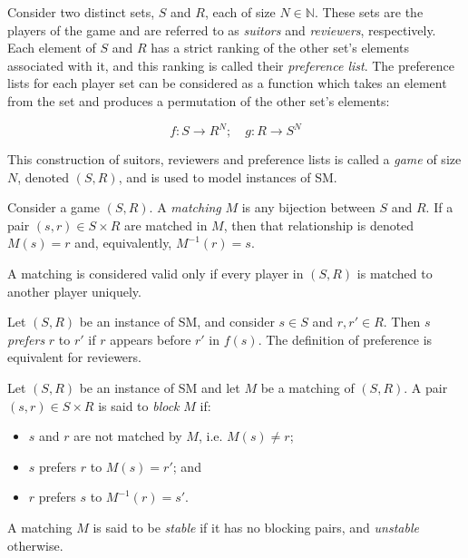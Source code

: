 \begin{definition}\label{def:sm_game}
    Consider two distinct sets, \(S\) and \(R\), each of size \(N \in \mathbb
    N\). These sets are the players of the game and are referred to as
    \emph{suitors} and \emph{reviewers}, respectively. Each element of \(S\) and
    \(R\) has a strict ranking of the other set's elements associated with it,
    and this ranking is called their \emph{preference list}. The preference
    lists for each player set can be considered as a function which takes an
    element from the set and produces a permutation of the other set's elements:

    \begin{equation}
        f: S \to R^N; \quad g: R \to S^N
    \end{equation}

    This construction of suitors, reviewers and preference lists is called a
    \emph{game} of size \(N\), denoted \((S, R)\), and is used to
    model instances of SM.
\end{definition}

\begin{definition}\label{def:sm_matching}
    Consider a game \((S, R)\). A \emph{matching} \(M\) is any
    bijection between \(S\) and \(R\). If a pair \((s, r) \in S
    \times R\) are matched in \(M\), then that relationship is denoted \(M(s) =
    r\) and, equivalently, \(M^{-1}(r) = s\).

    A matching is considered valid only if every player in \((S, R)\)
    is matched to another player uniquely.
\end{definition}

\begin{definition}\label{def:sm_preference}
    Let \((S, R)\) be an instance of SM, and consider \(s \in S\) and
    \(r, r' \in R\). Then \(s\) \emph{prefers} \(r\) to \(r'\) if \(r\) appears
    before \(r'\) in \(f(s)\). The definition of preference is equivalent for
    reviewers.
\end{definition}

\begin{definition}\label{def:sm_blocking}
    Let \((S, R)\) be an instance of SM and let \(M\) be a matching of \((S,
    R)\). A pair \((s, r) \in S \times R\) is said to \emph{block} \(M\) if:

    \begin{itemize}
        \item \(s\) and \(r\) are not matched by \(M\), i.e. \(M(s) \neq r\);
        \item \(s\) prefers \(r\) to \(M(s) = r'\); and
        \item \(r\) prefers \(s\) to \(M^{-1}(r) = s'\).
    \end{itemize}

    A matching \(M\) is said to be \emph{stable} if it has no blocking pairs,
    and \emph{unstable} otherwise.
\end{definition}

